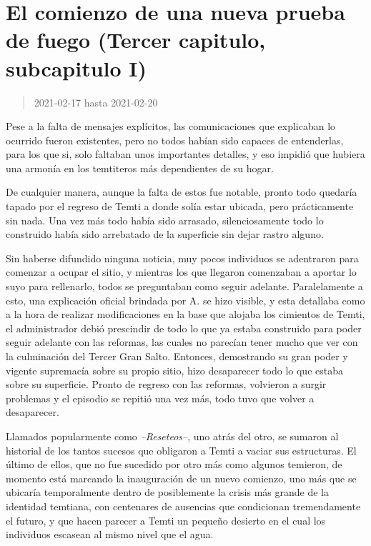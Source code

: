 \documentclass[
  spanish,
]{book}
\begin{document}
\hypertarget{el-comienzo-de-una-nueva-prueba-de-fuego-tercer-capitulo-subcapitulo-i}{%
\section{El comienzo de una nueva prueba de fuego (Tercer capitulo, subcapitulo I)}\label{el-comienzo-de-una-nueva-prueba-de-fuego-tercer-capitulo-subcapitulo-i}}

\begin{quote}
2021-02-17 hasta 2021-02-20
\end{quote}

Pese a la falta de mensajes explícitos, las comunicaciones que explicaban lo ocurrido fueron existentes, pero no todos habían sido capaces de entenderlas, para los que si, solo faltaban unos importantes detalles, y eso impidió que hubiera una armonía en los temtiteros más dependientes de su hogar.

De cualquier manera, aunque la falta de estos fue notable, pronto todo quedaría tapado por el regreso de Temti a donde solía estar ubicada, pero prácticamente sin nada. Una vez más todo había sido arrasado, silenciosamente todo lo construido había sido arrebatado de la superficie sin dejar rastro alguno.

Sin haberse difundido ninguna noticia, muy pocos individuos se adentraron para comenzar a ocupar el sitio, y mientras los que llegaron comenzaban a aportar lo suyo para rellenarlo, todos se preguntaban como seguir adelante. Paralelamente a esto, una explicación oficial brindada por A. se hizo visible, y esta detallaba como a la hora de realizar modificaciones en la base que alojaba los cimientos de Temti, el administrador debió prescindir de todo lo que ya estaba construido para poder seguir adelante con las reformas, las cuales no parecían tener mucho que ver con la culminación del Tercer Gran Salto. Entonces, demostrando su gran poder y vigente supremacía sobre su propio sitio, hizo desaparecer todo lo que estaba sobre su superficie. Pronto de regreso con las reformas, volvieron a surgir problemas y el episodio se repitió una vez más, todo tuvo que volver a desaparecer.

Llamados popularmente como \emph{--Reseteos--}, uno atrás del otro, se sumaron al historial de los tantos sucesos que obligaron a Temti a vaciar sus estructuras. El último de ellos, que no fue sucedido por otro más como algunos temieron, de momento está marcando la inauguración de un nuevo comienzo, uno más que se ubicaría temporalmente dentro de posiblemente la crisis más grande de la identidad temtiana, con centenares de ausencias que condicionan tremendamente el futuro, y que hacen parecer a Temti un pequeño desierto en el cual los individuos escasean al mismo nivel que el agua.
\end{document}
